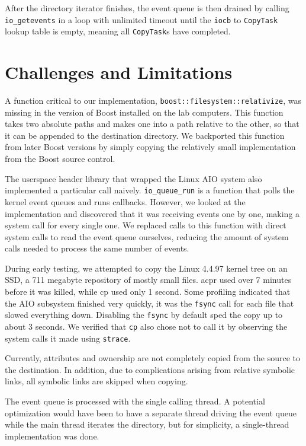 \documentclass[11pt]{article}
\begin{document}
After the directory iterator finishes, the event queue is then drained by calling \texttt{io\_getevents} in a loop with unlimited timeout until the \texttt{iocb} to \texttt{CopyTask} lookup table is empty, meaning all \texttt{CopyTask}s have completed.

\section{Challenges and Limitations}
A function critical to our implementation,
\texttt{boost::filesystem::relativize}, was missing in the version of Boost
installed on the lab computers. This function takes two absolute paths and makes
one into a path relative to the other, so that it can be appended to the
destination directory. We backported this function from later Boost versions by
simply copying the relatively small implementation from the Boost source
control.

The userspace header library that wrapped the Linux AIO system also implemented
a particular call naively. \texttt{io\_queue\_run} is a function that polls the
kernel event queues and runs callbacks. However, we looked at the implementation
and discovered that it was receiving events one by one, making a system call for
every single one. We replaced calls to this function with direct system calls to
read the event queue ourselves, reducing the amount of system calls needed to process the same number of events.

During early testing, we attempted to copy the Linux 4.4.97 kernel tree on an SSD, a 711 megabyte repository of mostly small files. acpr used over 7 minutes before it was killed, while cp used only 1 second. Some profiling indicated that the AIO subsystem finished very quickly, it was the \texttt{fsync} call for each file that slowed everything down. Disabling the \texttt{fsync} by default sped the copy up to about 3 seconds. We verified that \texttt{cp} also chose not to call it by observing the system calls it made using \texttt{strace}. 

Currently, attributes and ownership are not completely copied from the source to the destination. In addition, due to complications arising from relative symbolic links, all symbolic links are skipped when copying.

The event queue is processed with the single calling thread. A potential optimization would have been to have a separate thread driving the event queue while the main thread iterates the directory, but for simplicity, a single-thread implementation was done.
\end{document}

